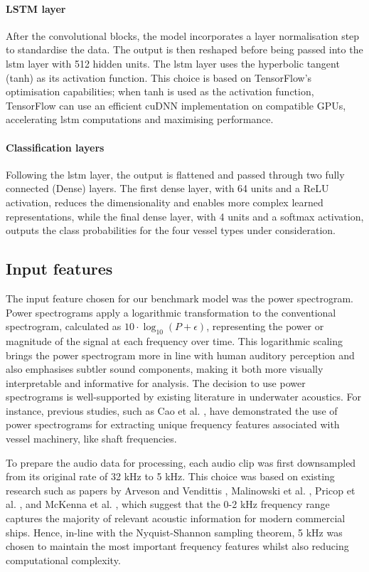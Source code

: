 \paragraph{LSTM layer} After the convolutional blocks, the model incorporates a layer normalisation step to standardise the data. The output is then reshaped before being passed into the \acrshort{lstm} layer with 512 hidden units. The \acrshort{lstm} layer uses the hyperbolic tangent (tanh) as its activation function. This choice is based on TensorFlow's optimisation capabilities; when tanh is used as the activation function, TensorFlow can use an efficient cuDNN implementation on compatible GPUs, accelerating \acrshort{lstm} computations and maximising performance.

\paragraph{Classification layers} Following the \acrshort{lstm} layer, the output is flattened and passed through two fully connected (Dense) layers. The first dense layer, with 64 units and a ReLU activation, reduces the dimensionality and enables more complex learned representations, while the final dense layer, with 4 units and a softmax activation, outputs the class probabilities for the four vessel types under consideration.

\subsection{Input features}

The input feature chosen for our benchmark model was the power spectrogram. Power spectrograms apply a logarithmic transformation to the conventional spectrogram, calculated as $10 \cdot \log_{10}(P + \epsilon)$, representing the power or magnitude of the signal at each frequency over time. This logarithmic scaling brings the power spectrogram more in line with human auditory perception and also emphasises subtler sound components, making it both more visually interpretable and informative for analysis. The decision to use power spectrograms is well-supported by existing literature in underwater acoustics. For instance, previous studies, such as Cao et al. \cite{cao_underwater_2019}, have demonstrated the use of power spectrograms for extracting unique frequency features associated with vessel machinery, like shaft frequencies. 

To prepare the audio data for processing, each audio clip was first downsampled from its original rate of 32 kHz to 5 kHz. This choice was based on existing research such as papers by Arveson and Vendittis \cite{arveson_radiated_2000}, Malinowski et al. \cite{malinowski_underwater_2001}, Pricop et al. \cite{pricop_underwater_2010}, and McKenna et al. \cite{mckenna_underwater_2012}, which suggest that the 0-2 kHz frequency range captures the majority of relevant acoustic information for modern commercial ships. Hence, in-line with the Nyquist-Shannon sampling theorem, 5 kHz was chosen to maintain the most important frequency features whilst also reducing computational complexity. 

